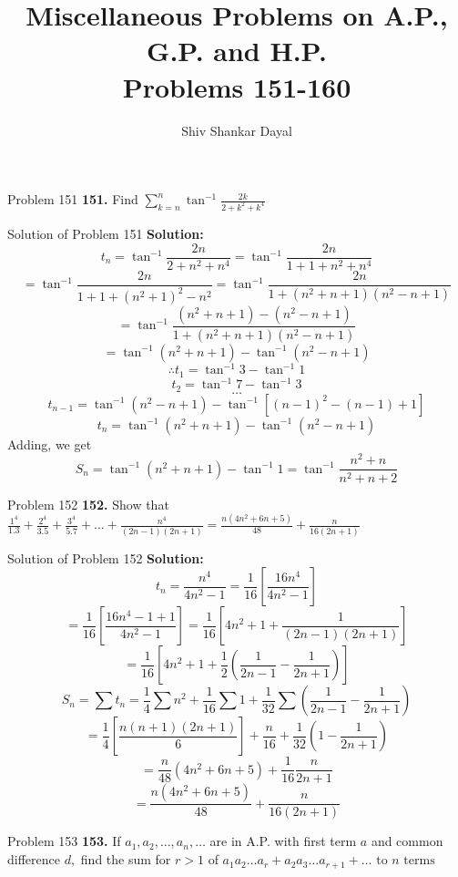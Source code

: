 \documentclass[aspectratio=1610,8pt]{beamer}
\title{Miscellaneous Problems on A.P., G.P. and H.P.\\Problems 151-160}
\author[Shiv Shankar Dayal]{Shiv Shankar Dayal}
\begin{document}
\begin{frame}
  \titlepage
\end{frame}
\begin{frame}{Problem 151}
  \textbf{151.} Find $\sum_{k=n}^n\tan^{-1}\frac{2k}{2 + k^2 + k^4}$
\end{frame}
\begin{frame}{Solution of Problem 151}
  \textbf{Solution:} $$t_n = \tan^{-1}\frac{2n}{2 + n^2 + n^4} = \tan^{-1}\frac{2n}{1 + 1 + n^2 + n^4}$$
  $$= \tan^{-1}\frac{2n}{1 + 1 + (n^2 + 1)^2 - n^2} = \tan^{-1}\frac{2n}{1 + (n^2 + n + 1)(n^2 - n + 1)}$$
  $$= \tan^{-1}\frac{(n^2 + n + 1) - (n^2 - n + 1)}{1 + (n^2 + n + 1)(n^2 - n + 1)}$$
  $$ = \tan^{-1}(n^2 + n + 1) - \tan^{-1}(n^2 - n + 1)$$
  $$\therefore t_1 = \tan^{-1}3 - \tan^{-1}1$$
  $$t_2 = \tan^{-1}7 - \tan^{-1}3$$
  $$\ldots$$
  $$t_{n - 1} = \tan^{-1}(n^2 -n + 1) - \tan^{-1}[(n - 1)^2 - (n - 1) + 1]$$
  $$t_n = \tan^{-1}(n^2 + n + 1) - \tan^{-1}(n^2 - n + 1)$$
  Adding, we get $$S_n = \tan^{-1}(n^2 + n + 1) - \tan^{-1}1 = \tan^{-1}\frac{n^2 + n}{n^2 + n + 2}$$
\end{frame}
\begin{frame}{Problem 152}
  \textbf{152.} Show that $\frac{1^4}{1.3} + \frac{2^4}{3.5} + \frac{3^4}{5.7} + \ldots + \frac{n^4}{(2n - 1)(2n + 1)} =
  \frac{n(4n^2 + 6n + 5)}{48} + \frac{n}{16(2n + 1)}$
\end{frame}
\begin{frame}{Solution of Problem 152}
  \textbf{Solution:} $$t_n = \frac{n^4}{4n^2 - 1} = \frac{1}{16}\left[\frac{16n^4}{4n^2 - 1}\right]$$
  $$= \frac{1}{16}\left[\frac{16n^4 - 1 + 1}{4n^2 - 1}\right] = \frac{1}{16}\left[4n^2 + 1 + \frac{1}{(2n - 1)(2n + 1)}\right]$$
  $$= \frac{1}{16}\left[4n^2 + 1 + \frac{1}{2}\left(\frac{1}{2n - 1} - \frac{1}{2n + 1}\right)\right]$$
  $$S_n = \sum t_n = \frac{1}{4}\sum n^2 + \frac{1}{16}\sum 1 + \frac{1}{32}\sum \left(\frac{1}{2n - 1} - \frac{1}{2n + 1}\right)$$
  $$= \frac{1}{4}\left[\frac{n(n + 1)(2n + 1)}{6}\right] + \frac{n}{16} + \frac{1}{32}\left(1 - \frac{1}{2n + 1}\right)$$
  $$= \frac{n}{48}(4n^2 + 6n + 5) + \frac{1}{16}\frac{n}{2n + 1}$$
  $$= \frac{n(4n^2 + 6n + 5)}{48} + \frac{n}{16(2n + 1)}$$
\end{frame}
\begin{frame}{Problem 153}
  \textbf{153.} If $a_1, a_2, \ldots, a_n, \ldots$ are in A.P. with first term $a$ and common difference $d,$ find the sum for $r >
  1$ of $a_1a_2\ldots a_r + a_2a_3\ldots a_{r + 1} + \ldots \text{~to~}n\text{~terms}$
\end{frame}
\end{document}
